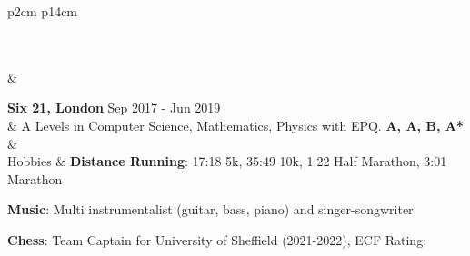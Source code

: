 \documentclass[11pt]{article}
\begin{document}
\begin{minipage}[t][0pt]{\linewidth}
\begin{tabular}[t]{p{2cm} p{14cm}}
\begin{itemize}
	               \end{itemize}

	               \\
	               \\ &

	               \textbf{Six 21, London} \hfill Sep 2017 - Jun 2019                                       \\ &
	               A Levels in Computer Science, Mathematics, Physics with EPQ. \hfill \textbf{A, A, B, A*} \\ &
	               \\

	               {Hobbies}           &
	               \textbf{Distance Running}: 17:18 5k, 35:49 10k, 1:22 Half Marathon, 3:01 Marathon

	               \textbf{Music}: Multi instrumentalist (guitar, bass, piano) and singer-songwriter

	               \textbf{Chess}: Team Captain for University of Sheffield (2021-2022), ECF Rating: \href{https://rating.englishchess.org.uk/players/games?domain=S&year=ALL&show_games=on&show_ratings=on&ECF_code=343167J}{\color{Blue}{1830}}
	\end{tabular}
\end{minipage}
\end{document}
